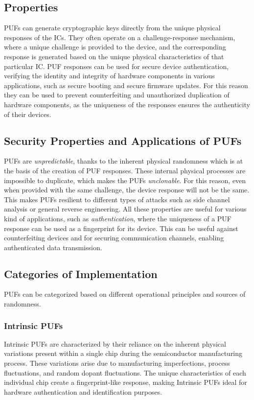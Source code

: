 \subsection{Properties} 
PUFs can generate cryptographic keys directly from the unique physical responses of the ICs.
They often operate on a challenge-response mechanism, where a unique challenge is provided to the device, and the corresponding response is generated based on the unique physical characteristics of that particular IC.
PUF responses can be used for secure device authentication, verifying the identity and integrity of hardware components in various applications, such as secure booting and secure firmware updates.
For this reason they can be used to prevent counterfeiting and unauthorized duplication of hardware components, as the uniqueness of the responses ensures the authenticity of their devices.

\subsection{Security Properties and Applications of PUFs}

PUFs are \textit{unpredictable}, thanks to the inherent physical randomness which is at the basis of the creation of PUF responses.
These internal physical processes are impossible to duplicate, which makes the PUFs \textit{unclonable}.
For this reason, even when provided with the same challenge, the device response will not be the same.
This makes PUFs resilient to different types of attacks such as side channel analysis or general reverse engineering.
All these properties are useful for various kind of applications, such as \textit{authentication}, where the uniqueness of a PUF response can be used as a fingerprint for its device.
This can be useful against counterfeiting devices and for securing communication channels, enabling authenticated data transmission.

\subsection{Categories of Implementation}
PUFs can be categorized based on different operational principles and sources of randomness. \cite{pufwiki}
\subsubsection{Intrinsic PUFs}
Intrinsic PUFs are characterized by their reliance on the inherent physical variations present within a single chip during the semiconductor manufacturing process.
These variations arise due to manufacturing imperfections, process fluctuations, and random dopant fluctuations.
The unique characteristics of each individual chip create a fingerprint-like response, making Intrinsic PUFs ideal for hardware authentication and identification purposes.

